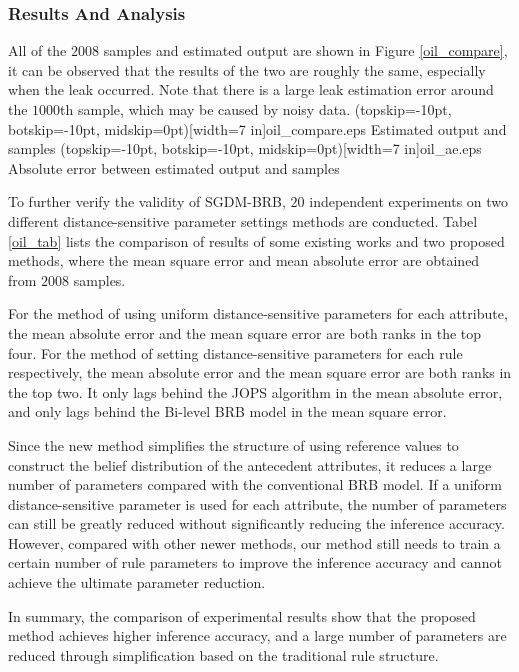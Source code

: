 \documentclass{ieeeaccess}
\begin{document}
\subsubsection{Results And Analysis}
All of the $2008$ samples and estimated output are shown in Figure \ref{oil_compare}, it can be observed that the results of the two are roughly the same,
especially when the leak occurred.
Note that there is a large leak estimation error around the $1000$th sample,
which may be caused by noisy data.
\Figure[!t](topskip=-10pt, botskip=-10pt, midskip=0pt)[width=7 in]{oil_compare.eps}
{Estimated output and samples\label{oil_compare}}
\Figure[!t](topskip=-10pt, botskip=-10pt, midskip=0pt)[width=7 in]{oil_ae.eps}
{Absolute error between estimated output and samples\label{oil_ae}}


To further verify the validity of SGDM-BRB, $20$ independent experiments on two different distance-sensitive parameter settings methods are conducted.
Tabel \ref{oil_tab} lists the comparison of results of some existing works and two proposed methods,
where the mean square error and mean absolute error are obtained from $2008$ samples.

For the method of using uniform distance-sensitive parameters for each attribute, the mean absolute error and the mean square error are both ranks in the top four.
For the method of setting distance-sensitive parameters for each rule respectively, the mean absolute error and the mean square error are both ranks in the top two.
It only lags behind the JOPS algorithm in the mean absolute error, and only lags behind the Bi-level BRB model in the mean square error.

Since the new method simplifies the structure of using reference values to construct the belief distribution of the antecedent attributes,
it reduces a large number of parameters compared with the conventional BRB model.
If a uniform distance-sensitive parameter is used for each attribute,
the number of parameters can still be greatly reduced without significantly reducing the inference accuracy.
However, compared with other newer methods, our method still needs to train a certain number of rule parameters to improve the inference accuracy and cannot achieve the ultimate parameter reduction.

In summary, the comparison of experimental results show that the proposed method  achieves higher inference accuracy,
and a large number of parameters are reduced through simplification based on the traditional rule structure.
\end{document}
